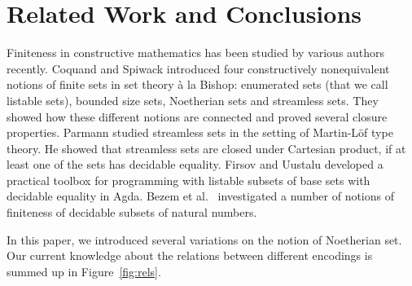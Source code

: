 \documentclass{eptcs}
\begin{document}
\section{Related Work and Conclusions}
\label{related-work-and-conclusions}

Finiteness in constructive mathematics has been studied by various authors
recently. Coquand and Spiwack \cite{Coquand} introduced four constructively
nonequivalent notions of finite sets in set theory \`a la Bishop: enumerated sets
(that we call listable sets), bounded size sets, Noetherian sets and streamless
sets. They showed how these different notions are connected and proved several
closure properties. Parmann \cite{Parmann} studied streamless sets in the setting of Martin-L\"of type theory. He showed that
streamless sets are closed under Cartesian product, if at least one of the sets
has decidable equality. Firsov and Uustalu \cite{Firsov-Uustalu} developed a practical toolbox for programming with listable subsets of base sets with decidable equality in Agda. Bezem et al.\ \cite{Uustalu} investigated a number of notions of finiteness of decidable subsets of natural numbers. 

In this paper, we introduced several variations on the notion of Noetherian
set. Our current knowledge about the relations between different encodings is
summed up in Figure~\ref{fig:rels}.
\end{document}
